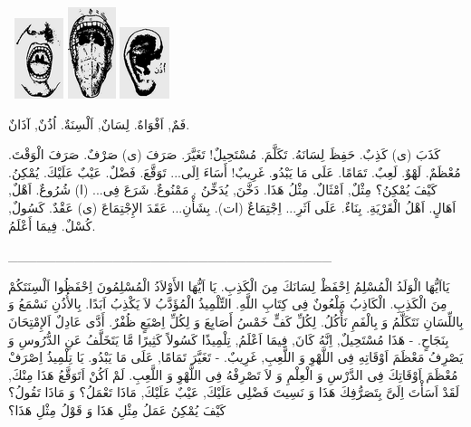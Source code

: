 \documentclass[a5paper]{article}
\begin{document}
\  \includegraphics[width=0.5626in,height=0.9272in]{images/MuhammadBagauddinprettified-img232.png}   \includegraphics[width=0.552in,height=1.052in]{images/MuhammadBagauddinprettified-img233.png}   \includegraphics[width=0.5728in,height=0.8228in]{images/MuhammadBagauddinprettified-img234.png} 

فَمٌ, اَفْوَاهٌ. لِسَانٌ, اَلْسِنَةٌ. اُذُنٌ, آذَانٌ.

كَذَبَ (ى) كَذِبٌ. حَفِظَ لِسَانَهُ. تَكَلَّمَ. مُسْتَحِيلٌ! تَغَيَّرَ. صَرَفَ (ى) صَرْفٌ. صَرَفَ الْوَقْتَ. مُعْظَمٌ. لَهْوٌ. لَعِبٌ. تَمَامًا. عَلَى مَا يَبْدُو. غَرِيبٌ! أَسَاءَ اِلَى... تَوَقَّعَ. فَضْلٌ. عَيْبٌ عَلَيْكَ. يُمْكِنُ. كَيْفَ يُمْكِنُ؟ مِثْلٌ, اَمْثَالٌ. مِثْلُ هَذَا. دَخَّنَ, يُدَخِّنُ . مَمْنُوعٌ. شَرَعَ فِى... (ا) شُرُوعٌ. اَهْلٌ, اَهَالٍ. اَهْلُ الْقَرْيَةِ. بِنَاءٌ. عَلَى اَثَرِ... اِجْتِمَاعٌ (ات). بِشَأْنِ... عَقَدَ الإِجْتِمَاعَ (ى) عَقْدٌ. كَسُولٌ, كُسْلٌ. فِيمَا أَعْلَمُ. 

\_\_\_\_\_\_\_\_\_\_\_\_\_\_\_\_\_\_\_\_\_\_\_\_\_\_\_\_\_\_\_\_\_\_

يَااَيُّهَا الْوَلَدُ الْمُسْلِمُ اِحْفَظْ لِسَانَكَ مِنَ الْكَذِبِ. يَا اَيُّهَا الأَوْلاَدُ الْمُسْلِمُونَ اِحْفَظُوا اَلْسِنَتَكُمْ مِنَ الْكَذِبِ. الْكَاذِبُ مَلْعُونٌ فِى كِتَابِ اللَّهِ. التِّلْمِيذُ الْمُؤَدَّبُ لاَ يَكْذِبُ اَبَدًا. بِالأُذُنِ نَسْمَعُ وَ بِاللِّسَانِ نَتَكَلَّمُ وَ بِالْفَمِ نَأْكُلُ. لِكُلِّ كَفٍّ خَمْسُ أَصَابِعَ وَ لِكُلِّ اِصْبَعٍ ظُفْرٌ. أَدَّى عَادِلٌ اَلإِمْتِحَانَ بِنَجَاحٍ. - هَذَا مُسْتَحِيلٌ, اِنَّهُ كَانَ, فِيمَا اَعْلَمُ, تِلْمِيذًا كَسُولاً كَثِيرًا مَّا يَتَخَلَّفُ عَنِ الدُّرُوسِ وَ يَصْرِفُ مَعْظَمَ اَوْقَاتِهِ فِى اللَّهْوِ وَ اللَّعِبِ, غَرِيبٌ. - تَغَيَّرَ تَمَامًا, عَلَى مَا يَبْدُو. يَا تِلْمِيذُ اِصْرَفْ مُعْظَمَ اَوْقَاتِكَ فِى الدَّرْسِ وَ الْعِلْمِ وَ لاَ تَصْرِفْهُ فِى اللَّهْوِ وَ اللَّعِبِ. لَمْ اَكُنْ اَتَوَقَّعُ هَذَا مِنْكَ, لَقَدْ اَسَأْتَ اِلَىَّ بِتَصَرُّفِكَ هَذَا وَ نَسِيتَ فَضْلِى عَلَيْكَ, عَيْبٌ عَلَيْكَ, مَاذَا تَعْمَلُ؟ وَ مَاذَا تَقُولُ؟ كَيْفَ يُمْكِنُ عَمَلُ مِثْلِ هَذَا وَ قَوْلُ مِثْلِ هَذَا؟
\end{document}

